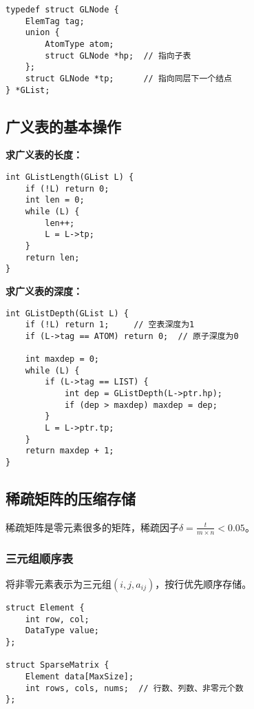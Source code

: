 \documentclass[12pt,a4paper]{amsart}
\begin{document}
\indent

\begin{lstlisting}[caption=子表结点结构定义]
typedef struct GLNode {
    ElemTag tag;
    union {
        AtomType atom;
        struct GLNode *hp;  // 指向子表
    };
    struct GLNode *tp;      // 指向同层下一个结点
} *GList;
\end{lstlisting}

\subsection{广义表的基本操作}

\textbf{求广义表的长度：}
\begin{lstlisting}[caption=求广义表长度]
int GListLength(GList L) {
    if (!L) return 0;
    int len = 0;
    while (L) {
        len++;
        L = L->tp;
    }
    return len;
}
\end{lstlisting}

\textbf{求广义表的深度：}
\begin{lstlisting}[caption=求广义表深度]
int GListDepth(GList L) {
    if (!L) return 1;     // 空表深度为1
    if (L->tag == ATOM) return 0;  // 原子深度为0
    
    int maxdep = 0;
    while (L) {
        if (L->tag == LIST) {
            int dep = GListDepth(L->ptr.hp);
            if (dep > maxdep) maxdep = dep;
        }
        L = L->ptr.tp;
    }
    return maxdep + 1;
}
\end{lstlisting}

\subsection{稀疏矩阵的压缩存储}

稀疏矩阵是零元素很多的矩阵，稀疏因子$\delta = \frac{t}{m \times n} < 0.05$。

\subsubsection{三元组顺序表}

将非零元素表示为三元组$(i, j, a_{ij})$，按行优先顺序存储。

\begin{verbatim}
struct Element {
    int row, col;
    DataType value;
};

struct SparseMatrix {
    Element data[MaxSize];
    int rows, cols, nums;  // 行数、列数、非零元个数
};
\end{verbatim}
\end{document}
